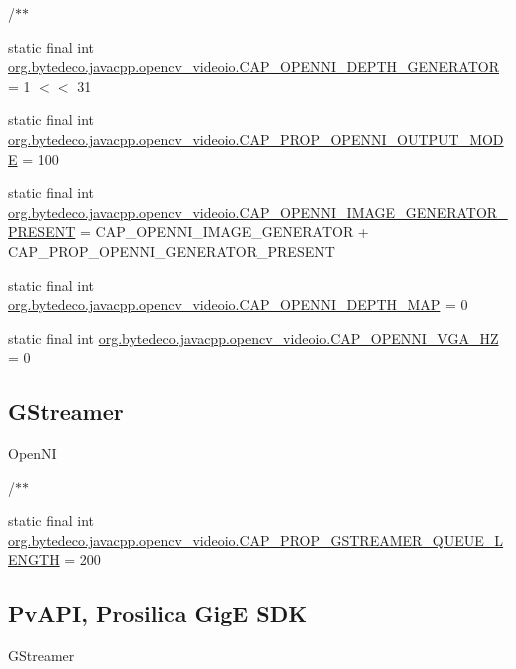 /$\ast$$\ast$ \begin{DoxyCompactItemize}
\item 
static final int \hyperlink{group__videoio__flags__others_gae3c0e63f05b21774fe01e3e9f737e8a0}{org.\+bytedeco.\+javacpp.\+opencv\+\_\+videoio.\+C\+A\+P\+\_\+\+O\+P\+E\+N\+N\+I\+\_\+\+D\+E\+P\+T\+H\+\_\+\+G\+E\+N\+E\+R\+A\+T\+OR} = 1 $<$$<$ 31
\item 
static final int \hyperlink{group__videoio__flags__others_gac9fa35868d2fa304aee7d72f50bc9dae}{org.\+bytedeco.\+javacpp.\+opencv\+\_\+videoio.\+C\+A\+P\+\_\+\+P\+R\+O\+P\+\_\+\+O\+P\+E\+N\+N\+I\+\_\+\+O\+U\+T\+P\+U\+T\+\_\+\+M\+O\+DE} = 100
\item 
static final int \hyperlink{group__videoio__flags__others_ga94fffc0304ea99800662b4a89e79898e}{org.\+bytedeco.\+javacpp.\+opencv\+\_\+videoio.\+C\+A\+P\+\_\+\+O\+P\+E\+N\+N\+I\+\_\+\+I\+M\+A\+G\+E\+\_\+\+G\+E\+N\+E\+R\+A\+T\+O\+R\+\_\+\+P\+R\+E\+S\+E\+NT} = C\+A\+P\+\_\+\+O\+P\+E\+N\+N\+I\+\_\+\+I\+M\+A\+G\+E\+\_\+\+G\+E\+N\+E\+R\+A\+T\+OR + C\+A\+P\+\_\+\+P\+R\+O\+P\+\_\+\+O\+P\+E\+N\+N\+I\+\_\+\+G\+E\+N\+E\+R\+A\+T\+O\+R\+\_\+\+P\+R\+E\+S\+E\+NT
\item 
static final int \hyperlink{group__videoio__flags__others_ga34a12b8e99e76dfa25af8fed3c199d46}{org.\+bytedeco.\+javacpp.\+opencv\+\_\+videoio.\+C\+A\+P\+\_\+\+O\+P\+E\+N\+N\+I\+\_\+\+D\+E\+P\+T\+H\+\_\+\+M\+AP} = 0
\item 
static final int \hyperlink{group__videoio__flags__others_gab75d47d5fe56c9248b689bf463a5c96b}{org.\+bytedeco.\+javacpp.\+opencv\+\_\+videoio.\+C\+A\+P\+\_\+\+O\+P\+E\+N\+N\+I\+\_\+\+V\+G\+A\+\_\+HZ} = 0
\end{DoxyCompactItemize}
\subsection*{G\+Streamer}
\label{_amgrpf74be661abd36d85d08a125100ee1f67}%
 Open\+NI 

/$\ast$$\ast$ \begin{DoxyCompactItemize}
\item 
static final int \hyperlink{group__videoio__flags__others_gafbbac7fafc3f6386e3234a007d25b25d}{org.\+bytedeco.\+javacpp.\+opencv\+\_\+videoio.\+C\+A\+P\+\_\+\+P\+R\+O\+P\+\_\+\+G\+S\+T\+R\+E\+A\+M\+E\+R\+\_\+\+Q\+U\+E\+U\+E\+\_\+\+L\+E\+N\+G\+TH} = 200
\end{DoxyCompactItemize}
\subsection*{Pv\+A\+PI, Prosilica GigE S\+DK}
\label{_amgrpad73e9ceb7c1dc02527eb584e89bd615}%
 G\+Streamer 

